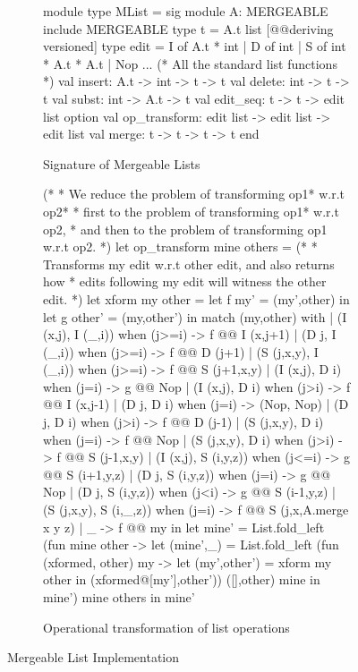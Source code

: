 \begin{figure}

\begin{subfigure}[b]{0.7\textwidth}
\begin{ocaml}
module type MList = sig
  module A: MERGEABLE
  include MERGEABLE
  type t = A.t list [@@deriving versioned]
  type edit = I of A.t * int
    | D of int
    | S of int * A.t * A.t
    | Nop
  ... (* All the standard list functions *)
  val insert: A.t -> int -> t -> t
  val delete: int -> t -> t
  val subst: int -> A.t -> t
  val edit_seq: t -> t -> edit list option
  val op_transform: edit list -> edit list -> edit list
  val merge: t -> t -> t -> t
end
\end{ocaml}
\caption{Signature of Mergeable Lists}
\label{fig:mlist-sig}
\end{subfigure}

\begin{subfigure}{0.75\textwidth}
\begin{ocaml}
(*
 * We reduce the problem of transforming op1* w.r.t op2* 
 * first to the problem of transforming op1* w.r.t op2,
 * and then to the problem of transforming op1 w.r.t op2.
*)
let op_transform mine others = 
  (*
   * Transforms my edit w.r.t other edit, and also returns how 
   * edits following my edit will witness the other edit.
   *)
  let xform my other = 
    let f my' = (my',other) in
    let g other' = (my,other') in
      match (my,other)  with 
      | (I (x,j), I (_,i)) when (j>=i) -> f @@ I (x,j+1)
      | (D j, I (_,i)) when (j>=i) -> f @@ D (j+1)
      | (S (j,x,y), I (_,i)) when (j>=i) -> f @@ S (j+1,x,y)
      | (I (x,j), D i) when (j=i) ->  g @@ Nop
      | (I (x,j), D i) when (j>i) ->  f @@ I (x,j-1)
      | (D j, D i) when (j=i) -> (Nop, Nop)
      | (D j, D i) when (j>i) ->  f @@ D (j-1)
      | (S (j,x,y), D i) when (j=i) -> f @@ Nop
      | (S (j,x,y), D i) when (j>i) -> f @@ S (j-1,x,y)
      | (I (x,j), S (i,y,z)) when (j<=i) -> g @@ S (i+1,y,z)
      | (D j, S (i,y,z)) when (j=i) -> g @@ Nop
      | (D j, S (i,y,z)) when (j<i) -> g @@ S (i-1,y,z)
      | (S (j,x,y), S (i,_,z)) when (j=i) -> f @@ S (j,x,A.merge x y z) 
      | _ -> f @@ my in
  let mine' = 
    List.fold_left 
      (fun mine other -> 
         let (mine',_) = 
           List.fold_left 
             (fun (xformed, other) my -> 
                let (my',other') = xform my other in
                  (xformed@[my'],other')) 
             ([],other) mine in
           mine') 
      mine others in
    mine'
\end{ocaml}
\caption{Operational transformation of list operations}
\label{fig:mlist-xform}
\end{subfigure}

\caption{Mergeable List Implementation}
\label{fig:mlist}
\end{figure}
